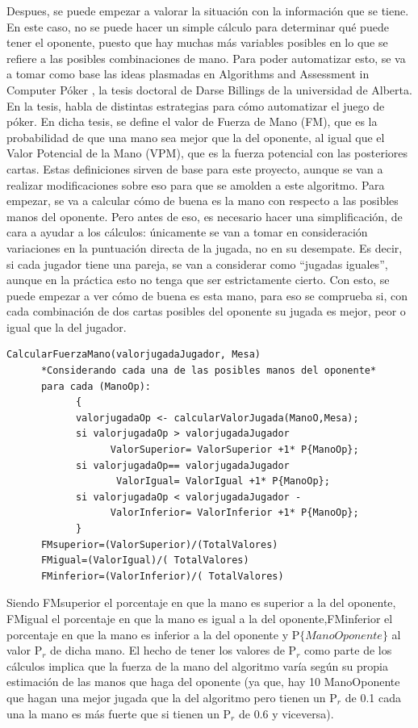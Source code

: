 Despues, se puede empezar a valorar la situación con la información que se tiene.
En este caso, no se puede hacer un simple cálculo para determinar qué puede tener el oponente, puesto que hay muchas más variables posibles en lo que se refiere a las posibles combinaciones de mano.
Para poder automatizar esto, se va a tomar como base las ideas plasmadas en Algorithms and Assessment in Computer Póker , la tesis doctoral de Darse Billings de la universidad de Alberta\cite{doctor}. En la tesis, habla de distintas estrategias para cómo automatizar el juego de póker.
En dicha tesis, se define el valor de Fuerza de Mano (FM), que es la probabilidad de que una mano sea mejor que la del oponente, al igual que el Valor Potencial de la Mano (VPM), que es la fuerza potencial con las posteriores cartas.
Estas definiciones sirven de base para este proyecto, aunque se van a realizar modificaciones sobre eso para que se amolden a este algoritmo. Para empezar, se va a calcular cómo de buena es la mano con respecto a las posibles manos del oponente. Pero antes de eso, es necesario hacer una simplificación, de cara a ayudar a los cálculos: únicamente se van a tomar en consideración variaciones en la puntuación directa de la jugada, no en su desempate. Es decir, si cada jugador tiene una pareja, se van a considerar como “jugadas iguales”, aunque en la práctica esto no tenga que ser estrictamente cierto.
Con esto, se puede empezar a ver cómo de buena es esta mano, para eso se comprueba si, con cada combinación de dos cartas posibles del oponente su jugada es mejor, peor o igual que la del jugador.
\begin{verbatim}
CalcularFuerzaMano(valorjugadaJugador, Mesa)
      *Considerando cada una de las posibles manos del oponente*
      para cada (ManoOp):
            {
            valorjugadaOp <- calcularValorJugada(ManoO,Mesa);
            si valorjugadaOp > valorjugadaJugador 
                  ValorSuperior= ValorSuperior +1* P{ManoOp};
            si valorjugadaOp== valorjugadaJugador 
                   ValorIgual= ValorIgual +1* P{ManoOp};
            si valorjugadaOp < valorjugadaJugador -
                  ValorInferior= ValorInferior +1* P{ManoOp};	
            }
      FMsuperior=(ValorSuperior)/(TotalValores)
      FMigual=(ValorIgual)/( TotalValores)
      FMinferior=(ValorInferior)/( TotalValores)
\end{verbatim}
Siendo FMsuperior el porcentaje en que la mano es superior a la del oponente, FMigual el porcentaje en que la mano es igual a la del oponente,FMinferior el porcentaje en que la mano es inferior a la del oponente y P$\{ManoOponente\}$ al valor P$_r$ de dicha mano.
El hecho de tener los valores de P$_r$ como parte de los cálculos implica que la fuerza de la mano del algoritmo varía según su propia estimación de las manos que haga del oponente (ya que, hay 10 ManoOponente que hagan una mejor jugada que la del algoritmo pero tienen un P$_r$ de 0.1 cada una la mano es más fuerte que si tienen un P$_r$ de 0.6 y viceversa).

